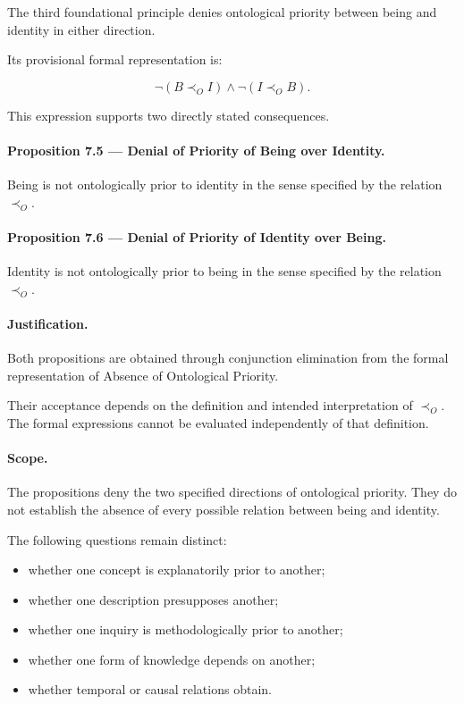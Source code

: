 The third foundational principle denies ontological priority
between being and identity in either direction.

Its provisional formal representation is:

\[
    \neg(B \prec_O I)
    \land
    \neg(I \prec_O B).
\]

This expression supports two directly stated consequences.

\paragraph{Proposition 7.5 — Denial of Priority of Being
over Identity.}

Being is not ontologically prior to identity in the sense
specified by the relation \(\prec_O\).

\paragraph{Proposition 7.6 — Denial of Priority of Identity
over Being.}

Identity is not ontologically prior to being in the sense
specified by the relation \(\prec_O\).

\paragraph{Justification.}

Both propositions are obtained through conjunction elimination
from the formal representation of Absence of Ontological
Priority.

Their acceptance depends on the definition and intended
interpretation of \(\prec_O\). The formal expressions cannot
be evaluated independently of that definition.

\paragraph{Scope.}

The propositions deny the two specified directions of
ontological priority. They do not establish the absence of
every possible relation between being and identity.

The following questions remain distinct:

\begin{itemize}
    \item whether one concept is explanatorily prior to another;
    \item whether one description presupposes another;
    \item whether one inquiry is methodologically prior to another;
    \item whether one form of knowledge depends on another;
    \item whether temporal or causal relations obtain.
\end{itemize}

